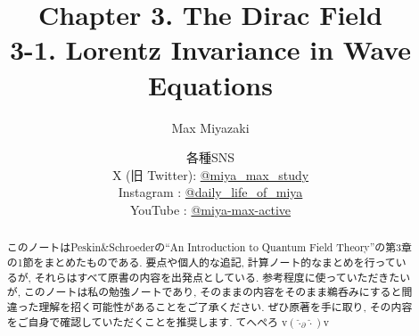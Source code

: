 \documentclass[a4paper,12pt]{article}
\title{Chapter 3. The Dirac Field\\
3-1. Lorentz Invariance in Wave Equations}
\date{各種SNS\\
    X (旧 Twitter): \href{https://x.com/miya_max_study}{@miya\_max\_study}\\
    Instagram : \href{https://www.instagram.com/daily_life_of_miya/}{@daily\_life\_of\_miya}\\
    YouTube : \href{https://www.youtube.com/@miya-max-active}{@miya-max-active}
    }
\author{Max Miyazaki}
\begin{document}
\maketitle

\vspace{1cm}
\begin{abstract}
    このノートはPeskin\&Schroederの``An Introduction to Quantum Field Theory''の第3章の1節をまとめたものである. 要点や個人的な追記, 計算ノート的なまとめを行っているが, それらはすべて原書の内容を出発点としている. 参考程度に使っていただきたいが, このノートは私の勉強ノートであり, そのままの内容をそのまま鵜呑みにすると間違った理解を招く可能性があることをご了承ください. ぜひ原著を手に取り, その内容をご自身で確認していただくことを推奨します. てへぺろ v$({\hat{\cdot}_\partial \hat{\cdot}})$v
\end{abstract}
    
    

\newpage
\color{blue}
\end{document}
